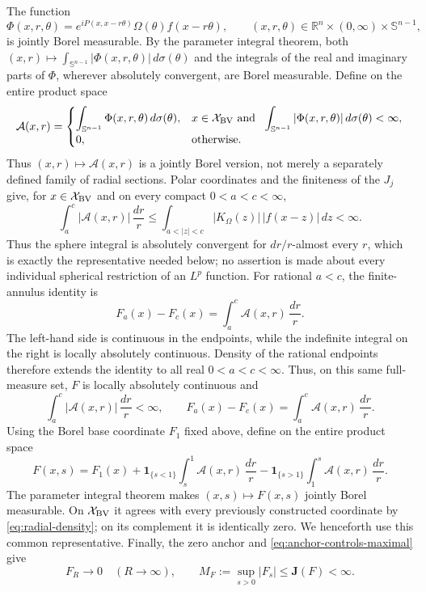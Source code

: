 \documentclass[11pt]{article}
\numberwithin{equation}{section}
\theoremstyle{remark}
\theoremstyle{definition}
\newcommand{\Sph}{\mathbb S}
\begin{document}
The function
\[
 \Phi(x,r,\theta)=e^{iP(x,x-r\theta)}
       \Omega(\theta)f(x-r\theta),
 \qquad (x,r,\theta)\in\mathbb R^n\times(0,\infty)\times\Sph^{n-1},
\]
is jointly Borel measurable.  By the parameter integral theorem, both
\((x,r)\mapsto\int_{\Sph^{n-1}}|\Phi(x,r,\theta)|\,d\sigma(\theta)\) and
the integrals of the real and imaginary parts of \(\Phi\), wherever
absolutely convergent, are Borel measurable.  Define on the entire product
space
\begin{equation}\label{eq:joint-radial-density-definition}
 \mathcal A(x,r)=
 \begin{cases}
  \displaystyle\int_{\Sph^{n-1}}\Phi(x,r,\theta)\,d\sigma(\theta),
  &x\in\mathcal X_{\rm BV}\ \text{and }\
   \displaystyle\int_{\Sph^{n-1}}|\Phi(x,r,\theta)|\,d\sigma(\theta)<\infty,\\
  0,&\text{otherwise}.
 \end{cases}
\end{equation}
Thus \((x,r)\mapsto\mathcal A(x,r)\) is a jointly Borel version, not merely
a separately defined family of radial sections.  Polar coordinates and
the finiteness of the $J_j$ give, for \(x\in\mathcal X_{\rm BV}\) and on
every compact $0<a<c<\infty$,
\[
 \int_a^c|\mathcal A(x,r)|\,\frac{dr}{r}
 \le\int_{a<|z|<c}|K_\Omega(z)|\,|f(x-z)|\,dz<\infty.
\]
Thus the sphere integral is absolutely convergent for $dr/r$-almost every
$r$, which is exactly the representative needed below; no assertion is
made about every individual spherical restriction of an $L^p$ function.
For rational $a<c$, the finite-annulus identity is
\[
 F_a(x)-F_c(x)=\int_a^c\mathcal A(x,r)\,\frac{dr}{r}.
\]
The left-hand side is continuous in the endpoints, while the indefinite
integral on the right is locally absolutely continuous.  Density of the
rational endpoints therefore extends the identity to all real
$0<a<c<\infty$.  Thus, on this same full-measure set, $F$ is locally
absolutely continuous and
\begin{equation}\label{eq:radial-density}
 \int_a^c|\mathcal A(x,r)|\,\frac{dr}{r}<\infty,
 \qquad
 F_a(x)-F_c(x)=\int_a^c\mathcal A(x,r)\,\frac{dr}{r}.
\end{equation}
Using the Borel base coordinate $F_1$ fixed above, define on the entire
product space
\begin{equation}\label{eq:joint-F-representative}
 F(x,s)=F_1(x)
 +\mathbf1_{\{s<1\}}\int_s^1\mathcal A(x,r)\,\frac{dr}{r}
 -\mathbf1_{\{s>1\}}\int_1^s\mathcal A(x,r)\,\frac{dr}{r}.
\end{equation}
The parameter integral theorem makes \((x,s)\mapsto F(x,s)\) jointly
Borel measurable.  On \(\mathcal X_{\rm BV}\) it agrees with every
previously constructed coordinate by \eqref{eq:radial-density}; on its
complement it is identically zero.  We henceforth use this common
representative.
Finally, the zero anchor and
\eqref{eq:anchor-controls-maximal} give
\[
 F_R\longrightarrow0\quad(R\to\infty),
 \qquad M_F:=\sup_{s>0}|F_s|\le\mathbf J(F)<\infty.
\]
\end{document}
